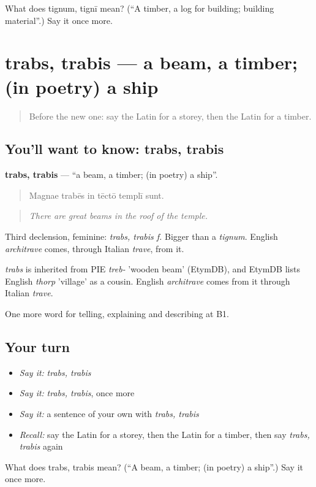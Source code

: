 \begin{tcolorbox}[breakable,colback=teal!4,colframe=teal!35!black,title={Before you move on}]
What does tignum, tignī mean? (\textquotedblleft{}A timber, a log for building; building material\textquotedblright{}.) Say it once more.
\end{tcolorbox}
\section[trabs, trabis]{trabs, trabis — a beam, a timber; (in poetry) a ship}

\label{lesson:LA-C457-trabs}



\begin{quote}
Before the new one: say the Latin for a storey, then the Latin for a timber.
\end{quote}

\subsection*{You'll want to know: trabs, trabis}
\textbf{trabs, trabis} — \textquotedblleft{}a beam, a timber; (in poetry) a ship\textquotedblright{}.

\begin{quote}
Magnae trabēs in tēctō templī sunt.
\end{quote}

\begin{quote}
\emph{There are great beams in the roof of the temple.}
\end{quote}

Third declension, feminine: \emph{trabs, trabis f.} Bigger than a \emph{tignum}. English \emph{architrave} comes, through Italian \emph{trave}, from it.

\begin{cousinweb}
\emph{trabs} is inherited from PIE \emph{treb-} 'wooden beam' (EtymDB), and EtymDB lists English \emph{thorp} 'village' as a cousin. English \emph{architrave} comes from it through Italian \emph{trave}.
\end{cousinweb}

\begin{grammarlens}[title={What you've built}]
One more word for telling, explaining and describing at B1.
\end{grammarlens}

\subsection*{Your turn}
\begin{itemize}
\raggedright
  \item \emph{Say it:} \emph{trabs, trabis}
  \item \emph{Say it:} \emph{trabs, trabis}, once more
  \item \emph{Say it:} a sentence of your own with \emph{trabs, trabis}
  \item \emph{Recall:} say the Latin for a storey, then the Latin for a timber, then say \emph{trabs, trabis} again
\end{itemize}

\begin{tcolorbox}[breakable,colback=teal!4,colframe=teal!35!black,title={Before you move on}]
What does trabs, trabis mean? (\textquotedblleft{}A beam, a timber; (in poetry) a ship\textquotedblright{}.) Say it once more.
\end{tcolorbox}
